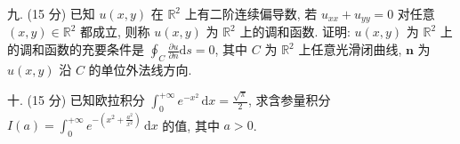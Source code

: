 \documentclass{examcollection}
\begin{document}
{\begin{minipage}{\textwidth}
九. (15 分) 已知 $u(x, y)$ 在 $\mathbb{R}^2$ 上有二阶连续偏导数, 若 $u_{xx} + u_{yy} = 0$ 对任意 $(x, y) \in \mathbb{R}^2$ 都成立, 则称 $u(x, y)$ 为 $\mathbb{R}^2$ 上的调和函数. 证明: $u(x, y)$ 为 $\mathbb{R}^2$ 上的调和函数的充要条件是 $\oint_C \frac{\partial u}{\partial n} \mathrm{d}s = 0$, 其中 $C$ 为 $\mathbb{R}^2$ 上任意光滑闭曲线, $\pmb{n}$ 为 $u(x, y)$ 沿 $C$ 的单位外法线方向.\par
十. (15 分) 已知欧拉积分 $\int_0^{+\infty} e^{-x^2} \, \mathrm{d}x = \frac{\sqrt{\pi}}{2}$, 求含参量积分 $I(a) = \int_0^{+\infty} e^{-\left(x^2 + \frac{a^2}{x^2}\right)} \, \mathrm{d}x$ 的值, 其中 $a > 0$.\par
\end{minipage}}
\ifdim\dimexpr\ht\proofbox+\dp\proofbox\relax>\textheight
\noindent\resizebox{!}{\textheight}{\usebox{\proofbox}}\else\noindent\usebox{\proofbox}\fi\clearpage
\end{document}
